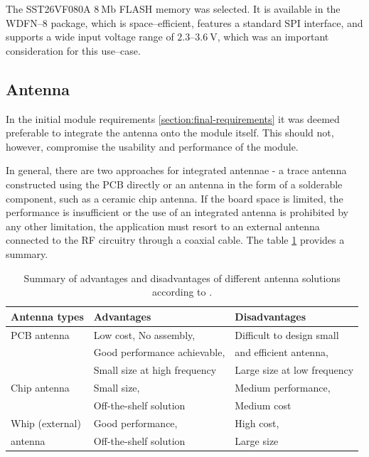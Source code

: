 The SST26VF080A $8~\mathrm{Mb}$ FLASH memory was selected. It is available in the WDFN--8 package, which is space--efficient, features a standard SPI interface, and supports a wide input voltage range of $2.3\text{--}3.6~\mathrm{V}$, which was an important consideration for this use--case.

\subsection{\label{section:antenna}Antenna}
In the initial module requirements \ref{section:final-requirements} it was deemed preferable to integrate the antenna onto the module itself. This should not, however, compromise the usability and performance of the module. 

In general, there are two approaches for integrated antennae - a trace antenna constructed using the PCB directly or an antenna in the form of a solderable component, such as a ceramic chip antenna. If the board space is limited, the performance is insufficient or the use of an integrated antenna is prohibited by any other limitation, the application must resort to an external antenna connected to the RF circuitry through a coaxial cable. The table \ref{table:antenna-solutions} provides a summary.

\begin{table}[H]
\begin{center}
\caption{\label{table:antenna-solutions}Summary of advantages and disadvantages of different antenna solutions according to \cite{andersen_selecting_2008}.}
    \begin{tabular}{|l|l|l|}
    \hline
    \textbf{Antenna types} & \textbf{Advantages} & \textbf{Disadvantages} \\
    \hline
    PCB antenna  & Low cost, No assembly,        & Difficult to design small \\
                 & Good performance achievable,  & and efficient antenna, \\
                 & Small size at high frequency  & Large size at low frequency \\
    \hline
    Chip antenna & Small size,                   & Medium performance, \\
                 & Off-the-shelf solution        & Medium cost \\
    \hline
    Whip (external)& Good performance,           & High cost, \\
    antenna        & Off-the-shelf solution      & Large size \\
    \hline
    \end{tabular}
\end{center}
\end{table}

